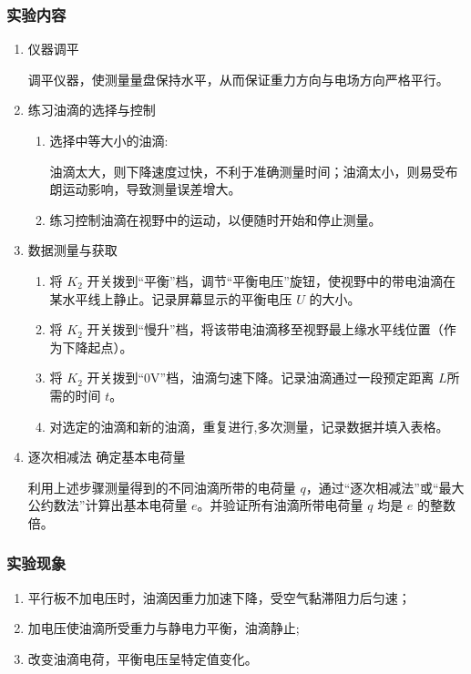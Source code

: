 \documentclass[yuxi]{../template/Report}%
\begin{document}
\subsubsection{实验内容}

\begin{enumerate}
    \item 仪器调平

    调平仪器，使测量量盘保持水平，从而保证重力方向与电场方向严格平行。

    \item 练习油滴的选择与控制

    \begin{enumerate}
        \item 选择中等大小的油滴:

        油滴太大，则下降速度过快，不利于准确测量时间；油滴太小，则易受布朗运动影响，导致测量误差增大。

        \item 练习控制油滴在视野中的运动，以便随时开始和停止测量。
    \end{enumerate}

    \item 数据测量与获取

    \begin{enumerate}
        \item 将 $K_2$ 开关拨到“平衡”档，调节“平衡电压”旋钮，使视野中的带电油滴在某水平线上静止。记录屏幕显示的平衡电压 $U$ 的大小。

        \item 将 $K_2$ 开关拨到“慢升”档，将该带电油滴移至视野最上缘水平线位置（作为下降起点）。

        \item 将 $K_2$ 开关拨到“0V”档，油滴匀速下降。记录油滴通过一段预定距离 $L$所需的时间 $t$。

        \item 对选定的油滴和新的油滴，重复进行,多次测量，记录数据并填入表格。
    \end{enumerate}

    \item 逐次相减法 确定基本电荷量

    利用上述步骤测量得到的不同油滴所带的电荷量 $q$，通过“逐次相减法”或“最大公约数法”计算出基本电荷量 $e$。并验证所有油滴所带电荷量 $q$ 均是 $e$ 的整数倍。

\end{enumerate}
\subsubsection{实验现象}
\begin{enumerate}
    \item 平行板不加电压时，油滴因重力加速下降，受空气黏滞阻力后匀速；
    \item 加电压使油滴所受重力与静电力平衡，油滴静止;
    \item 改变油滴电荷，平衡电压呈特定值变化。
\end{enumerate}
\end{document}
